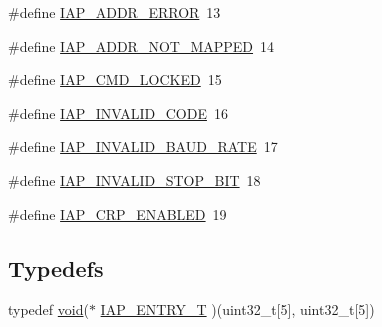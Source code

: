 \begin{DoxyCompactItemize}
\item 
\#define \hyperlink{group__COMMON__IAP_gaaff51c256373e4a20f8dab1adc1300f3}{I\-A\-P\-\_\-\-A\-D\-D\-R\-\_\-\-E\-R\-R\-O\-R}~13
\item 
\#define \hyperlink{group__COMMON__IAP_ga4cfd7e0c133c450664f0a60bfbbd9eaa}{I\-A\-P\-\_\-\-A\-D\-D\-R\-\_\-\-N\-O\-T\-\_\-\-M\-A\-P\-P\-E\-D}~14
\item 
\#define \hyperlink{group__COMMON__IAP_gafdceac1acd5c460094011136c08574a4}{I\-A\-P\-\_\-\-C\-M\-D\-\_\-\-L\-O\-C\-K\-E\-D}~15
\item 
\#define \hyperlink{group__COMMON__IAP_ga456a8363a47d21d7198056da4b1e9f61}{I\-A\-P\-\_\-\-I\-N\-V\-A\-L\-I\-D\-\_\-\-C\-O\-D\-E}~16
\item 
\#define \hyperlink{group__COMMON__IAP_ga6913ca0660dc1a2cccd8c6b09bcdbc75}{I\-A\-P\-\_\-\-I\-N\-V\-A\-L\-I\-D\-\_\-\-B\-A\-U\-D\-\_\-\-R\-A\-T\-E}~17
\item 
\#define \hyperlink{group__COMMON__IAP_ga6c61111082b04ba6780151c83f8c3644}{I\-A\-P\-\_\-\-I\-N\-V\-A\-L\-I\-D\-\_\-\-S\-T\-O\-P\-\_\-\-B\-I\-T}~18
\item 
\#define \hyperlink{group__COMMON__IAP_gaaccc191ce402e19b0c0ae399f614efe8}{I\-A\-P\-\_\-\-C\-R\-P\-\_\-\-E\-N\-A\-B\-L\-E\-D}~19
\end{DoxyCompactItemize}
\subsection*{Typedefs}
\begin{DoxyCompactItemize}
\item 
typedef \hyperlink{Paradigm_2Tern__EE_2small_2portmacro_8h_a14d32f8130d3c0b212cfc751730b5b49}{void}($\ast$ \hyperlink{group__COMMON__IAP_ga532416c10103b6bb939ef311603eabe4}{I\-A\-P\-\_\-\-E\-N\-T\-R\-Y\-\_\-\-T} )(uint32\-\_\-t\mbox{[}5\mbox{]}, uint32\-\_\-t\mbox{[}5\mbox{]})
\end{DoxyCompactItemize}
